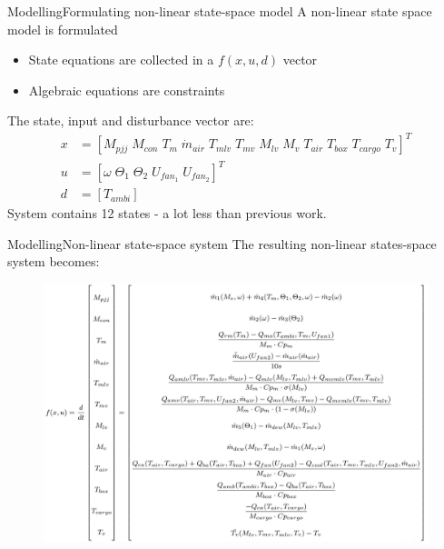 
\begin{frame}{Modelling}{Formulating non-linear state-space model}
	A non-linear state space model is formulated
	\begin{itemize}
		\item State equations are collected in a $f(x,u,d)$ vector
		\item Algebraic equations are constraints
	\end{itemize}

	The state, input and disturbance vector are:
	\begin{equation}  \label{eq:xu}
		\begin{split}
			x & = [M_{pjj}	\;
				M_{con} \;
				T_m \;
				\dot{m}_{air}\;
				T_{mlv}      \;
				T_{mv}       \;
				M_{lv}       \;
				M_v          \;
				T_{air}      \;
				T_{box}      \;
				T_{cargo}    \;
				T_v]^T \\
			u & = [\omega	\;
				\Theta_1	\;
				\Theta_2     \;
				U_{fan_1}    \;
				U_{fan_2}]^T \\
			d & = [T_{ambi}]
		\end{split}
	\end{equation}
	System contains 12 states - a lot less than previous work.

\end{frame}




\begin{frame}{Modelling}{Non-linear state-space system}
	The resulting non-linear states-space system becomes:
	\begin{figure}[h!]
		\centering
		\includegraphics[width=1.04\textwidth]{Graphics/f_x_u.jpeg}
		\label{fig:f_x_u}
	\end{figure}
\end{frame}





